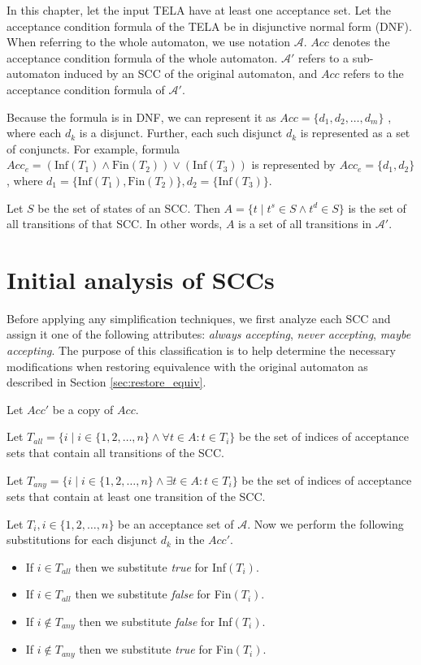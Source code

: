\documentclass[
  digital, %
  twoside, %
  table,   %
  lof,     %
  lot,     %
]{fithesis3}
\begin{document}
In this chapter, let the input TELA have at least one acceptance set. Let the acceptance condition formula of the TELA be in disjunctive normal form (DNF). When referring to the whole automaton, we use notation $\mathcal{A}$. $Acc$ denotes the acceptance condition formula of the whole automaton. $\mathcal{A'}$ refers to a sub-automaton induced by an SCC of the original automaton, and $Acc$ refers to the acceptance condition formula of $\mathcal{A'}$.

Because the formula is in DNF, we can represent it as $Acc = \{d_1, d_2, \dots, d_m\}$ , where each $d_k$ is a disjunct. Further, each such disjunct $d_k$ is represented as a set of conjuncts. For example, formula $Acc_e = (\text{Inf}(T_1) \wedge \text{Fin}(T_2)) \vee (\text{Inf}(T_3))$ is represented by $Acc_e = \{d_1, d_2\}$, where $d_1 = \{\text{Inf}(T_1), \text{Fin}(T_2)\}, d_2 = \{\text{Inf}(T_3)\}$. 

Let $S$ be the set of states of an SCC. Then $A = \{t \mid t^s \in S \wedge t^d \in S\}$ is the set of all transitions of that SCC. In other words, $A$ is a set of all transitions in $\mathcal{A'}$.

\section{Initial analysis of SCCs}
\label{sec:init_analysis}
Before applying any simplification techniques, we first analyze each SCC and assign it one of the following attributes: \emph{always accepting}, \emph{never accepting}, \emph{maybe accepting}. The purpose of this classification is to help determine the necessary modifications when restoring equivalence with the original automaton as described in Section \ref{sec:restore_equiv}. 

Let $Acc'$ be a copy of $Acc$.

Let $T_{all} = \{i \mid i \in \{1, 2, \dots, n\} \wedge \forall t \in A \colon t \in T_i \}$ be the set of indices of acceptance sets that contain all transitions of the SCC.

Let $T_{any} = \{i \mid i \in \{1, 2, \dots, n\} \wedge \exists t \in A \colon t \in T_i \}$ be the set of indices of acceptance sets that contain at least one transition of the SCC.

Let $T_i, i \in \{1, 2, \dots, n\}$ be an acceptance set of $\mathcal{A}$. Now we perform the following substitutions for each disjunct $d_k$ in the $Acc'$.
\begin{itemize}
  \item If $i \in T_{all}$ then we substitute \emph{true} for Inf$(T_i)$.
  \item If $i \in T_{all}$ then we substitute \emph{false} for Fin$(T_i)$.
  \item If $i \notin T_{any}$ then we substitute \emph{false} for Inf$(T_i)$.
  \item If $i \notin T_{any}$ then we substitute \emph{true} for Fin$(T_i)$.
\end{itemize}
\end{document}
